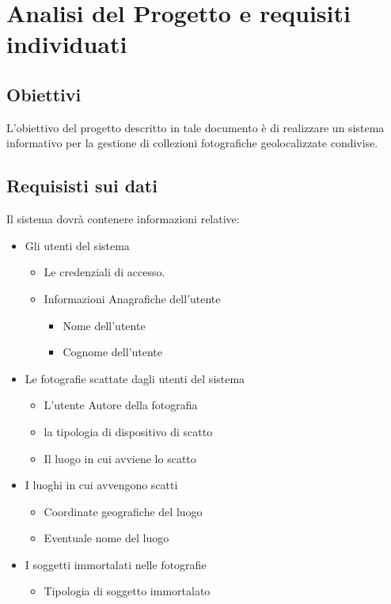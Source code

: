 \chapter{Analisi del Progetto e requisiti individuati}
\section{Obiettivi}
L’obiettivo del progetto descritto in tale documento è di realizzare un sistema informativo per la gestione di collezioni fotografiche geolocalizzate condivise.
\section{Requisisti sui dati}
Il sistema dovrà contenere informazioni relative:
\begin{itemize}
    \item Gli utenti del sistema
        \begin{itemize}
            \item Le credenziali di accesso.
             \item Informazioni Anagrafiche dell’utente
                \begin{itemize}
                    \item Nome dell’utente
                    \item Cognome dell’utente
                \end{itemize}
        \end{itemize}
    \item Le fotografie scattate dagli utenti del sistema
        \begin{itemize}
            \item L’utente Autore della fotografia
            \item la tipologia di dispositivo di scatto
            \item Il luogo in cui avviene lo scatto
        \end{itemize}
    \item I luoghi in cui avvengono scatti
        \begin{itemize}
            \item Coordinate geografiche del luogo
            \item Eventuale nome del luogo
        \end{itemize}
    \item I soggetti immortalati nelle fotografie
        \begin{itemize}
            \item Tipologia di soggetto immortalato
        \end{itemize}
\end{itemize}

